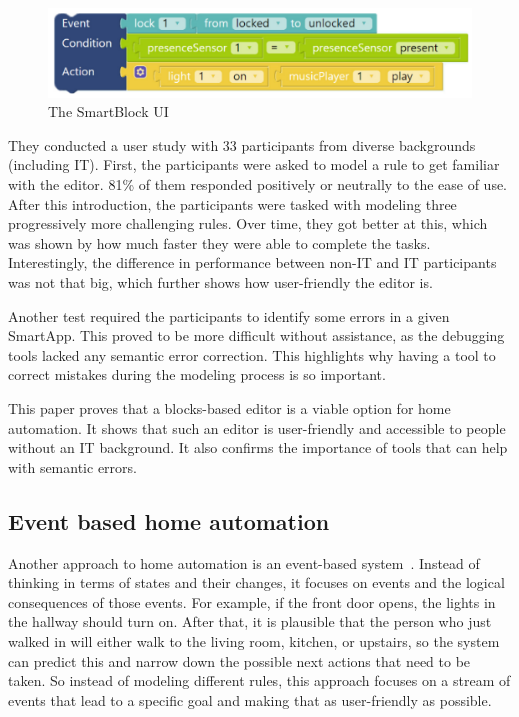 \documentclass[11pt,a4paper]{report}
\begin{document}
\begin{figure}
    \centering
    \includegraphics[width=0.8\linewidth]{images/smartBlockRule.png}
    \caption{The SmartBlock UI~\cite{SOTA_SmartBlock}}
    \label{fig:smart_block_UI}
\end{figure}

They conducted a user study with 33 participants from diverse backgrounds (including IT). First, the participants were asked to model a rule to get familiar with the editor. 81\% of them responded positively or neutrally to the ease of use. After this introduction, the participants were tasked with modeling three progressively more challenging rules. Over time, they got better at this, which was shown by how much faster they were able to complete the tasks. Interestingly, the difference in performance between non-IT and IT participants was not that big, which further shows how user-friendly the editor is.

Another test required the participants to identify some errors in a given SmartApp. This proved to be more difficult without assistance, as the debugging tools lacked any semantic error correction. This highlights why having a tool to correct mistakes during the modeling process is so important.

This paper proves that a blocks-based editor is a viable option for home automation. It shows that such an editor is user-friendly and accessible to people without an IT background. It also confirms the importance of tools that can help with semantic errors.

\subsection{Event based home automation}
Another approach to home automation is an event-based system~\cite{SOTA_EventCalculus}. Instead of thinking in terms of states and their changes, it focuses on events and the logical consequences of those events. For example, if the front door opens, the lights in the hallway should turn on. After that, it is plausible that the person who just walked in will either walk to the living room, kitchen, or upstairs, so the system can predict this and narrow down the possible next actions that need to be taken. So instead of modeling different rules, this approach focuses on a stream of events that lead to a specific goal and making that as user-friendly as possible.
\end{document}
